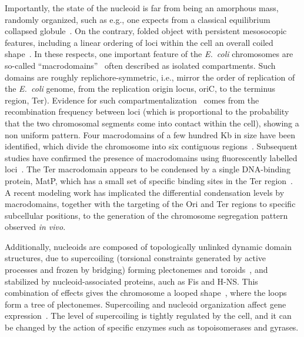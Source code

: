 \documentclass[a4paper,12pt,pre,superscriptaddress]{revtex4}
\begin{document}
Importantly, the state of the nucleoid is far from being an amorphous
mass, randomly organized, such as e.g., one expects from a classical
equilibrium collapsed globule~\cite{Mirny2011}. On the contrary,
folded object with persistent mesosocopic features, including a linear
ordering of loci within the cell an overall coiled
shape~\cite{WLP+06,Wiggins2010,HadizadehYazdi2012,Fisher2013,Pelletier2012}.
In these respects, one important feature of the \emph{E.~coli}
chromosomes are so-called ``macrodomains''~\cite{VPR+04,MRB05,EB06}
often described as isolated compartments. Such domains are roughly
replichore-symmetric, i.e., mirror the order of replication of the
\emph{E.~coli} genome, from the replication origin locus, oriC, to the
terminus region, Ter). Evidence for such
compartmentalization~\cite{VPR+04} comes from the recombination
frequency between loci (which is proportional to the probability that
the two chromosomal segments come into contact within the cell),
showing a non uniform pattern.
%
Four macrodomains of a few hundred Kb in size have been identified,
which divide the chromosome into six contiguous
regions~\cite{Dame2011,Benza2012}.  Subsequent studies have confirmed
the presence of macrodomains using fluorescently labelled
loci~\cite{EMB08,EB06,LMB+05}. The Ter macrodomain appears to be
condensed by a single DNA-binding protein, MatP, which has a small set
of specific binding sites in the Ter region~\cite{Mercier2008}.
A recent modeling work has implicated the differential condensation
levels by macrodomains, together with the targeting of the Ori and Ter
regions to specific subcellular positions, to the generation of the
chromosome segregation pattern observed \emph{in
  vivo}\cite{Junier2013}.

Additionally, nucleoids are composed of topologically unlinked dynamic
domain structures, due to supercoiling (torsional constraints
generated by active processes and frozen by bridging) forming
plectonemes and toroids~\cite{Trun1998}, and stabilized by
nucleoid-associated proteins, auch as Fis and H-NS. This combination
of effects gives the chromosome a looped
shape~\cite{Postow2004,Skoko2006,Kavenoff1976}, where the loops form a
tree of plectonemes. Supercoiling and nucleoid organization affect
gene expression~\cite{Breier2004,Postow2004,Dillon2010}.
The level of supercoiling is tightly regulated by the cell, and it can
be changed by the action of specific enzymes such as topoisomerases
and gyrases.
\end{document}
